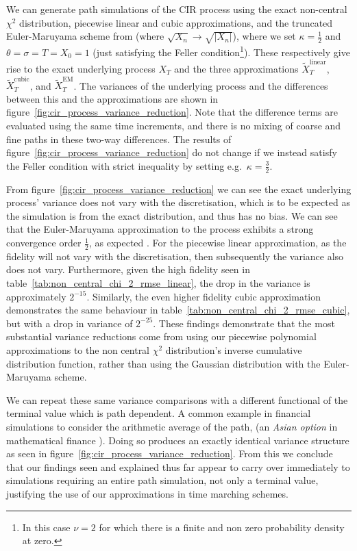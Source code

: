 \documentclass[manuscript,review]{acmart}
\begin{document}
We can generate path simulations of the CIR process using the exact non-central $ \chi^2 $ distribution, piecewise linear and cubic approximations, and the truncated Euler-Maruyama scheme from \citet{higham2002strong} (where $ \sqrt{X_n} \to \sqrt{\lvert X_n \rvert} $), where we set $ \kappa= \tfrac{1}{2}$ and  $ \theta = \sigma =T = X_0 = 1 $ (just satisfying the Feller condition\footnote{In this case $ \nu = 2 $ for which there is a finite and non zero probability density at zero.}). These respectively give rise to the exact underlying process $ X_T $ and the three approximations $ \widetilde{X}^{\mathrm{linear}}_T $, $ \widetilde{X}^{\mathrm{cubic}}_T $, and 
$ \widetilde{X}^{\mathrm{EM}}_T $.
The variances of the underlying process and the differences between this and the approximations are shown in figure~\ref{fig:cir_process_variance_reduction}. Note that the difference terms are evaluated using the same time increments, and there is no mixing of coarse and fine paths in these two-way differences. The results of figure~\ref{fig:cir_process_variance_reduction} do not change if we instead satisfy the Feller condition with strict inequality by setting e.g.\ $ \kappa = \tfrac{3}{2} $.

From figure~\ref{fig:cir_process_variance_reduction} we can see the exact underlying process' variance does not vary with the discretisation, which is to be expected as the simulation is from the exact distribution, and thus has no bias. We can see that the Euler-Maruyama approximation to the process exhibits a strong convergence order $ \tfrac{1}{2} $, as expected \citep{higham2002strong,gyongy1998note}. For the piecewise linear approximation, as the fidelity will not vary with the discretisation, then subsequently the variance also does not vary. Furthermore, given the high fidelity seen in table~\ref{tab:non_central_chi_2_rmse_linear}, the drop in the variance is approximately $ 2^{-15} $. Similarly, the even higher fidelity cubic approximation demonstrates the same behaviour in table~\ref{tab:non_central_chi_2_rmse_cubic}, but with a drop in variance of $ 2^{-25} $. These findings demonstrate that the most substantial variance reductions come from using our piecewise polynomial approximations to the non central $ \chi^2 $ distribution's inverse cumulative distribution function, rather than using the Gaussian distribution with the Euler-Maruyama scheme. 

We can repeat these same variance comparisons with a different functional of the terminal value which is path dependent. A common example in financial simulations to consider the arithmetic average of the path, (an \textit{Asian option} in mathematical finance \citep{glasserman2013monte}). Doing so produces an exactly identical variance structure as seen in figure~\ref{fig:cir_process_variance_reduction}. From this we conclude that our findings seen and explained thus far appear to carry over immediately to simulations requiring an entire path simulation, not only a terminal value, justifying the use of our approximations in time marching schemes.
\end{document}
